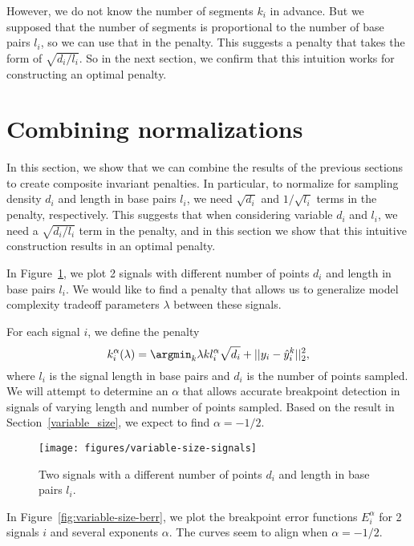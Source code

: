 \documentclass{article}
\begin{document}
However, we do not know the number of segments $k_i$ in advance. But
we supposed that the number of segments is proportional to the number
of base pairs $l_i$, so we can use that in the penalty. This suggests
a penalty that takes the form of $\sqrt{d_i/l_i}$. So in the next
section, we confirm that this intuition works for constructing an
optimal penalty.


\newpage
\section{Combining normalizations}
\label{combining_penalties}
In this section, we show that we can combine the results of the
previous sections to create composite invariant penalties. In
particular, to normalize for sampling density $d_i$ and length in base
pairs $l_i$, we need $\sqrt{d_i}$ and $1/\sqrt{l_i}$ terms in the
penalty, respectively. This suggests that when considering variable
$d_i$ and $l_i$, we need a $\sqrt{d_i/l_i}$ term in the penalty, and
in this section we show that this intuitive construction results in an
optimal penalty.

In Figure~\ref{fig:variable-size-signals}, we plot 2 signals with
different number of points $d_i$ and length in base pairs $l_i$. We
would like to find a penalty that allows us to generalize model
complexity tradeoff parameters $\lambda$ between these signals.

For each signal $i$, we define the penalty
\begin{equation}
  \label{eq:kstar_composite}
  k_i^\alpha(\lambda) = \argmin_k \lambda k l_i^\alpha \sqrt{d_i}
  + ||y_i - \hat y_i^k||^2_2,
\end{equation}
where $l_i$ is the signal length in base pairs and $d_i$ is the number
of points sampled. We will attempt to determine an $\alpha$ that
allows accurate breakpoint detection in signals of varying length and
number of points sampled. Based on the result in
Section~\ref{variable_size}, we expect to find $\alpha=-1/2$.

\begin{figure}[H]
  \centering
\texttt{[image: figures/variable-size-signals]}
  \caption{Two signals with a different number of
    points $d_i$ and length in base pairs $l_i$.}
\label{fig:variable-size-signals}
\end{figure}

\newpage

In Figure~\ref{fig:variable-size-berr}, we plot the breakpoint error
functions $E_i^\alpha$ for 2 signals $i$ and several exponents
$\alpha$. The curves seem to align when $\alpha=-1/2$.
\end{document}
